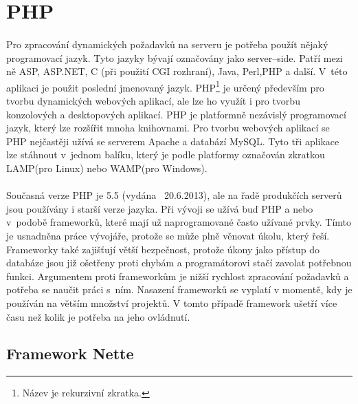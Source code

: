 \documentclass[11pt,a4paper,titlepage,oneside]{book}
\begin{document}
	\section{PHP}
		\paragraph{} Pro zpracování dynamických požadavků na serveru je potřeba použít nějaký programovací jazyk. Tyto jazyky bývají označovány jako server--side. Patří mezi ně ASP, ASP.NET, C (při použití \ac{CGI} rozhraní), Java, Perl,\acs{PHP} a další. V~této aplikaci je použit poslední jmenovaný jazyk. \ac{PHP}\footnote{Název je rekurzivní zkratka.} je určený především pro tvorbu dynamických webových aplikací, ale lze ho využít i pro tvorbu konzolových a desktopových aplikací. PHP je platformně nezávislý programovací jazyk, který lze rozšířit mnoha knihovnami. Pro tvorbu webových aplikací se \ac{PHP} nejčastěji užívá se serverem Apache a databází MySQL. Tyto tři aplikace lze stáhnout v~jednom balíku, který je podle platformy označován zkratkou LAMP(pro Linux) nebo WAMP(pro Windows)\cite{wiki_php}.




		\paragraph{} Současná verze PHP je 5.5 (vydána ~20.6.2013\cite{php_net}), ale na řadě produkčích serverů jsou používány i starší verze jazyka. Při vývoji se užívá buď  PHP a nebo v~podobě frameworků, které mají už naprogramované často užívané prvky. Tímto je usnadněna práce vývojáře, protože se může plně věnovat úkolu, který řeší. Frameworky také zajišťují větší bezpečnost, protože úkony jako přístup do databáze jsou již ošetřeny proti chybám a programátorovi stačí zavolat potřebnou funkci. Argumentem proti frameworkům je nižší rychlost zpracování požadavků a potřeba se naučit práci s~ním\cite{wiki_framework}. Nasazení frameworků se vyplatí v momentě, kdy je používán na větším množství projektů. V tomto případě framework ušetří více času než kolik je potřeba na jeho ovládnutí.
		\subsection{Framework Nette}
\end{document}
